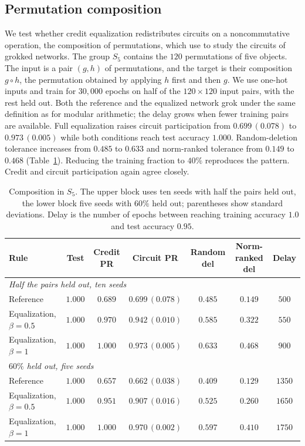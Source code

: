 \documentclass{article} %
\begin{document}
\subsection{Permutation composition}
\label{app:groups}
We test whether credit equalization redistributes circuits on a noncommutative operation, the composition of permutations, which \citet{chughtai2023toy} use to study the circuits of grokked networks. The group $S_5$ contains the $120$ permutations of five objects. The input is a pair $(g, h)$ of permutations, and the target is their composition $g \circ h$, the permutation obtained by applying $h$ first and then $g$. We use one-hot inputs and train for $30{,}000$ epochs on half of the $120 \times 120$ input pairs, with the rest held out. Both the reference and the equalized network grok under the same definition as for modular arithmetic; the delay grows when fewer training pairs are available. Full equalization raises circuit participation from $0.699\,(0.078)$ to $0.973\,(0.005)$ while both conditions reach test accuracy $1.000$. Random-deletion tolerance increases from $0.485$ to $0.633$ and norm-ranked tolerance from $0.149$ to $0.468$ (Table~\ref{tab:groups}). Reducing the training fraction to $40\%$ reproduces the pattern. Credit and circuit participation again agree closely.

\begin{table}[!ht]
\caption{Composition in $S_5$. The upper block uses ten seeds with half the pairs held out, the lower block five seeds with $60\%$ held out; parentheses show standard deviations. Delay is the number of epochs between reaching training accuracy $1.0$ and test accuracy $0.95$.}
\label{tab:groups}
\begin{center}
\small
\begin{tabular}{lcccccc}
\toprule
Rule & Test & Credit PR & Circuit PR & Random del & Norm-ranked del & Delay \\
\midrule
\multicolumn{7}{l}{\emph{Half the pairs held out, ten seeds}} \\
Reference & $1.000$ & $0.689$ & $0.699\,(0.078)$ & $0.485$ & $0.149$ & $500$ \\
Equalization, $\beta{=}0.5$ & $1.000$ & $0.970$ & $0.942\,(0.010)$ & $0.585$ & $0.322$ & $550$ \\
Equalization, $\beta{=}1$ & $1.000$ & $1.000$ & $0.973\,(0.005)$ & $0.633$ & $0.468$ & $900$ \\
\midrule
\multicolumn{7}{l}{\emph{$60\%$ held out, five seeds}} \\
Reference & $1.000$ & $0.657$ & $0.662\,(0.038)$ & $0.409$ & $0.129$ & $1350$ \\
Equalization, $\beta{=}0.5$ & $1.000$ & $0.951$ & $0.907\,(0.016)$ & $0.525$ & $0.260$ & $1650$ \\
Equalization, $\beta{=}1$ & $1.000$ & $1.000$ & $0.970\,(0.002)$ & $0.597$ & $0.410$ & $1750$ \\
\bottomrule
\end{tabular}
\end{center}
\end{table}
\end{document}
